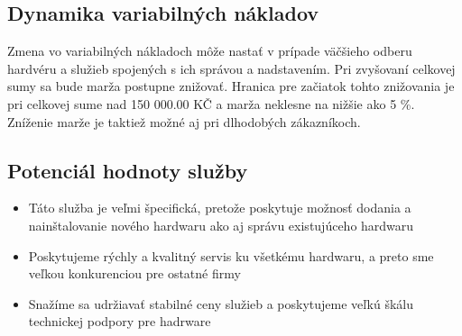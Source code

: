 \documentclass[a4paper, 11pt]{article}
\begin{document}
\subsection*{Dynamika variabilných nákladov}
 Zmena vo variabilných nákladoch môže nastať  v prípade väčšieho odberu hardvéru a služieb spojených s ich správou a nadstavením. Pri zvyšovaní celkovej sumy sa bude marža postupne znižovať. Hranica pre začiatok tohto znižovania je pri celkovej sume nad 150 000.00 KČ a marža neklesne na nižšie ako 5 \%. Zníženie marže je taktiež možné aj pri dlhodobých zákazníkoch.

\subsection*{Potenciál hodnoty služby}
\begin{itemize}
\item Táto služba je veľmi špecifická, pretože poskytuje  možnosť dodania a nainštalovanie nového hardwaru ako aj správu existujúceho hardwaru
\item Poskytujeme rýchly a kvalitný servis ku všetkému hardwaru, a preto sme veľkou konkurenciou pre ostatné firmy
\item Snažíme sa udržiavať stabilné ceny služieb a poskytujeme veľkú škálu technickej podpory pre hadrware
\end{itemize}

\clearpage

\end{document}

